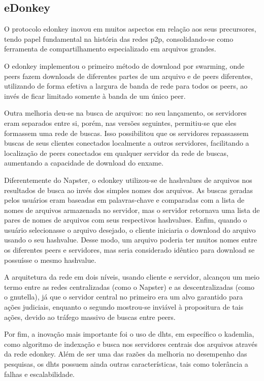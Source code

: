 \subsection*{eDonkey}

O protocolo \gls{edonkey} inovou em muitos aspectos em relação aos seus precursores,
tendo papel fundamental na história das redes \gls*{p2p}, consolidando-se como
ferramenta de compartilhamento especializado em arquivos grandes.

O \gls*{edonkey} implementou o primeiro método de download por \gls{swarming}, onde
\glspl*{peer} fazem downloads de diferentes partes de um arquivo e de \glspl*{peer}
diferentes, utilizando de forma efetiva a largura de banda de rede para todos os
\glspl*{peer}, ao invés de ficar limitado somente à banda de um único \gls*{peer}.

Outra melhoria deu-se na busca de arquivos: no seu lançamento, os servidores eram
separados entre si, porém, nas versões seguintes, permitiu-se que eles formassem uma
rede de buscas. Isso possibilitou que os servidores repassassem buscas de seus clientes
conectados localmente a outros servidores, facilitando a localização de \glspl*{peer}
conectados em qualquer servidor da rede de buscas, aumentando a capacidade de download
do enxame.

Diferentemente do Napster, o \gls*{edonkey} utilizou-se de \glspl{hashvalue} de arquivos
nos resultados de busca ao invés dos simples nomes dos arquivos. As buscas geradas
pelos usuários eram baseadas em palavras-chave e comparadas com a lista de nomes de
arquivos armazenada no servidor, mas o servidor retornava uma lista de pares de nomes
de arquivos com seus respectivos \glspl*{hashvalue}. Enfim, quando o usuário
selecionasse o arquivo desejado, o cliente iniciaria o download do arquivo usando o seu
\gls*{hashvalue}. Desse modo, um arquivo poderia ter muitos nomes entre os diferentes
\glspl*{peer} e servidores, mas seria considerado idêntico para download se possuísse o
mesmo \gls*{hashvalue}.

A arquitetura da rede em dois níveis, usando cliente e servidor, alcançou um meio termo
entre as redes centralizadas (como o Napster) e as descentralizadas (como o
\gls*{gnutella}), já que o servidor central no primeiro era um alvo garantido para ações
judiciais, enquanto o segundo mostrou-se inviável à propositura de tais ações, devido
ao tráfego massivo de buscas entre \glspl*{peer}.

Por fim, a inovação mais importante foi o uso de \glspl{dht}, em específico o
\gls{kademlia}, como algoritmo de indexação e busca nos servidores centrais dos
arquivos através da rede \gls*{edonkey}. Além de ser uma das razões da melhoria no
desempenho das pesquisas, os \glspl*{dht} possuem ainda outras características, tais
como tolerância a falhas e escalabilidade.

